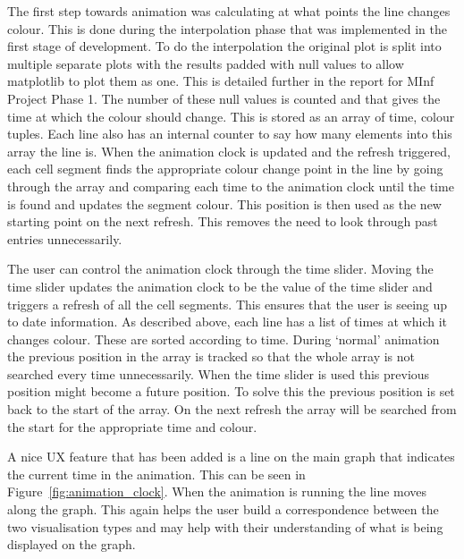 The first step towards animation was calculating at what points the line changes colour.  This is done during the interpolation phase that was implemented in the first stage of development.  To do the interpolation the original plot is split into multiple separate plots with the results padded with null values to allow matplotlib to plot them as one.  This is detailed further in the report for MInf Project Phase 1.  The number of these null values is counted and that gives the time at which the colour should change.  This is stored as an array of time, colour tuples.  Each line also has an internal counter to say how many elements into this array the line is.  When the animation clock is updated and the refresh triggered, each cell segment finds the appropriate colour change point in the line by going through the array and comparing each time to the animation clock until the time is found and updates the segment colour.  This position is then used as the new starting point on the next refresh.  This removes the need to look through past entries unnecessarily.

The user can control the animation clock through the time slider.  Moving the time slider updates the animation clock to be the value of the time slider and triggers a refresh of all the cell segments. This ensures that the user is seeing up to date information.   As described above, each line has a list of times at which it changes colour.  These are sorted according to time.  During `normal' animation the previous position in the array is tracked so that the whole array is not searched every time unnecessarily.  When the time slider is used this previous position might become a future position.  To solve this the previous position is set back to the start of the array.  On the next refresh the array will be searched from the start for the appropriate time and colour.

A nice \ac{UX} feature that has been added is a line on the main graph that indicates the current time in the animation. This can be seen in Figure~\ref{fig:animation_clock}.  When the animation is running the line moves along the graph.  This again helps the user build a correspondence between the two visualisation types and may help with their understanding of what is being displayed on the graph.

